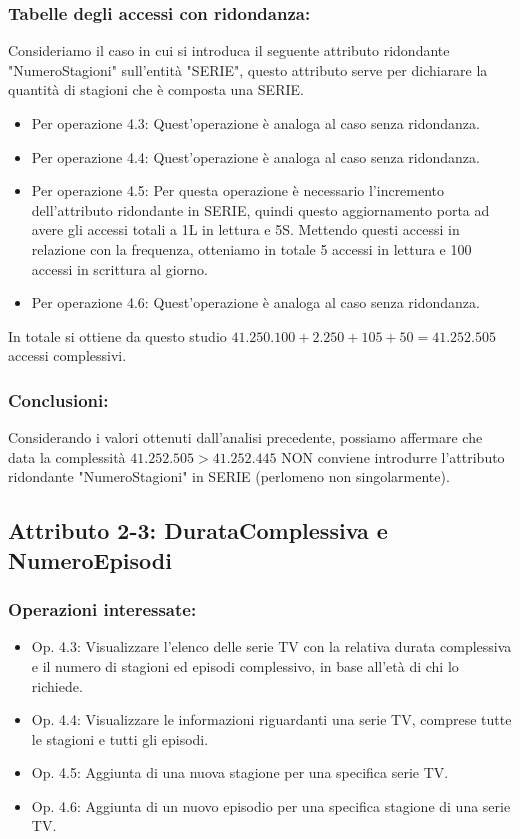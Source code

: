 \documentclass[a4paper,12pt]{report}
\begin{document}
\subsubsection{Tabelle degli accessi con ridondanza:}
Consideriamo il caso in cui si introduca il seguente attributo ridondante "NumeroStagioni" sull'entità "SERIE", questo attributo serve per dichiarare la quantità di stagioni che è composta una SERIE.
\begin{itemize}
	\item Per operazione 4.3: Quest'operazione è analoga al caso senza ridondanza.
	\item Per operazione 4.4: Quest'operazione è analoga al caso senza ridondanza.
	\item Per operazione 4.5: Per questa operazione è necessario l'incremento dell'attributo ridondante in SERIE, quindi questo aggiornamento porta ad avere gli accessi totali a 1L in lettura e 5S. Mettendo questi accessi in relazione con la frequenza, otteniamo in totale 5 accessi in lettura e 100 accessi in scrittura al giorno.
	\item Per operazione 4.6: Quest'operazione è analoga al caso senza ridondanza.
\end{itemize}

In totale si ottiene da questo studio $41.250.100 + 2.250 + 105 + 50 = 41.252.505$ accessi complessivi.
\subsubsection{Conclusioni:}
Considerando i valori ottenuti dall'analisi precedente, possiamo affermare che data la complessità $41.252.505 > 41.252.445$ NON conviene introdurre l'attributo ridondante "NumeroStagioni" in SERIE (perlomeno non singolarmente).


\subsection{Attributo 2-3: DurataComplessiva e NumeroEpisodi}
\subsubsection{Operazioni interessate:}
\begin{itemize}
	\item Op. 4.3: Visualizzare l’elenco delle serie TV con la relativa durata complessiva e il numero di stagioni ed episodi complessivo, in base all’età di chi lo richiede.
	\item Op. 4.4: Visualizzare le informazioni riguardanti una serie TV, comprese tutte le stagioni e tutti gli episodi.
	\item Op. 4.5: Aggiunta di una nuova stagione per una specifica serie TV.
	\item Op. 4.6: Aggiunta di un nuovo episodio per una specifica stagione di una serie TV.
\end{itemize}
\end{document}
